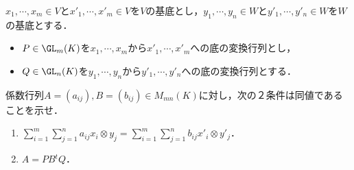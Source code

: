 \documentclass[uplatex, dvipdfmx]{jsreport}
\begin{document}
\begin{proposition}[テンソルの変換]\label{prop-basis-change-of-tensor}
    $x_1,\cdots,x_m\in V$と$x'_1,\cdots,x'_m\in V$を$V$の基底とし，$y_1,\cdots,y_n\in W$と$y'_1,\cdots,y'_n\in W$を$W$の基底とする．
    \begin{itemize}
        \item $P\in\GL_m(K)$を$x_1,\cdots,x_m$から$x'_1,\cdots,x'_m$への底の変換行列とし，
        \item $Q\in\GL_n(K)$を$y_1,\cdots,y_n$から$y'_1,\cdots,y'_n$への底の変換行列とする．
    \end{itemize}
    係数行列$A=(a_{ij}),B=(b_{ij})\in M_{mn}(K)$に対し，次の２条件は同値であることを示せ．
    \begin{enumerate}
        \item $\sum^m_{i=1}\sum^n_{j=1}a_{ij}x_i\otimes y_j=\sum^m_{i=1}\sum^n_{j=1}b_{ij}x'_i\otimes y'_j$．
        \item $A=PB{}^t\!Q$．
    \end{enumerate}
\end{proposition}
\end{document}
